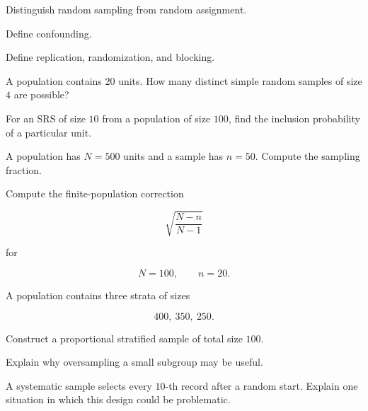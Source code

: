 \begin{exercise}[1]
Distinguish random sampling from random assignment.
\end{exercise}

\begin{exercise}[1]
Define confounding.
\end{exercise}

\begin{exercise}[1]
Define replication, randomization, and blocking.
\end{exercise}

\begin{exercise}[2]
A population contains \(20\) units. How many distinct simple random
samples of size \(4\) are possible?
\end{exercise}

\begin{exercise}[2]
For an SRS of size \(10\) from a population of size \(100\), find the
inclusion probability of a particular unit.
\end{exercise}

\begin{exercise}[2]
A population has \(N=500\) units and a sample has \(n=50\). Compute the
sampling fraction.
\end{exercise}

\begin{exercise}[2]
Compute the finite-population correction

\[
\sqrt{
\frac{N-n}{N-1}
}
\]

for

\[
N=100,
\qquad
n=20.
\]
\end{exercise}

\begin{exercise}[2]
A population contains three strata of sizes

\[
400,\ 350,\ 250.
\]

Construct a proportional stratified sample of total size \(100\).
\end{exercise}

\begin{exercise}[2]
Explain why oversampling a small subgroup may be useful.
\end{exercise}

\begin{exercise}[2]
A systematic sample selects every \(10\)-th record after a random start.
Explain one situation in which this design could be problematic.
\end{exercise}

